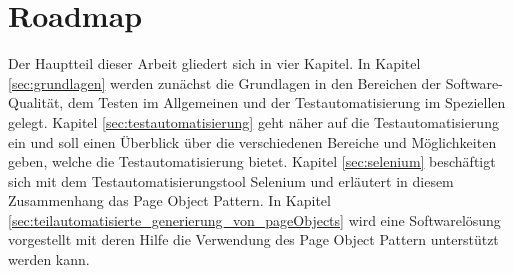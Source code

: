 \section{Roadmap}
\label{roadmap}
Der Hauptteil dieser Arbeit gliedert sich in vier Kapitel. In Kapitel \ref{sec:grundlagen} werden zunächst die Grundlagen in den Bereichen der Software-Qualität, dem Testen im Allgemeinen und der Testautomatisierung im Speziellen gelegt.
Kapitel \ref{sec:testautomatisierung} geht näher auf die Testautomatisierung ein und soll einen Überblick über die verschiedenen Bereiche und Möglichkeiten geben, welche die Testautomatisierung bietet.
Kapitel \ref{sec:selenium} beschäftigt sich mit dem Testautomatisierungstool Selenium und erläutert in diesem Zusammenhang das Page Object Pattern.
In Kapitel \ref{sec:teilautomatisierte_generierung_von_pageObjects} wird eine Softwarelösung vorgestellt mit deren Hilfe die Verwendung des Page Object Pattern unterstützt werden kann.

  




